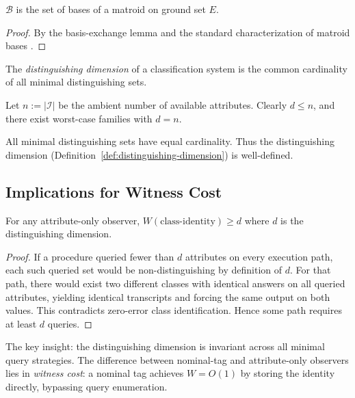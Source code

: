 \begin{theorem}\label{thm:matroid-bases}
$\mathcal{B}$ is the set of bases of a matroid on ground set $E$.
\end{theorem}

\begin{proof}
By the basis-exchange lemma and the standard characterization of matroid bases \cite{Welsh1976}.
\end{proof}

\begin{definition}\label{def:distinguishing-dimension}
The \emph{distinguishing dimension} of a classification system is the common cardinality of all minimal distinguishing sets.
\end{definition}

\begin{remark}
Let $n := |\mathcal{I}|$ be the ambient number of available attributes. Clearly $d \le n$, and there exist worst-case families with $d = n$.
\end{remark}

\begin{corollary}\label{cor:well-defined-distinguishing-dimension}
All minimal distinguishing sets have equal cardinality. Thus the distinguishing dimension (Definition~\ref{def:distinguishing-dimension}) is well-defined.
\end{corollary}

\subsection{Implications for Witness Cost}

\begin{corollary}\label{cor:attribute-only-witness-lb}
For any attribute-only observer, $W(\text{class-identity}) \geq d$ where $d$ is the distinguishing dimension.
\end{corollary}

\begin{proof}
If a procedure queried fewer than $d$ attributes on every execution path, each such queried set would be non-distinguishing by definition of $d$. For that path, there would exist two different classes with identical answers on all queried attributes, yielding identical transcripts and forcing the same output on both values. This contradicts zero-error class identification. Hence some path requires at least $d$ queries.
\end{proof}

The key insight: the distinguishing dimension is invariant across all minimal query strategies. The difference between nominal-tag and attribute-only observers lies in \emph{witness cost}: a nominal tag achieves $W = O(1)$ by storing the identity directly, bypassing query enumeration.
